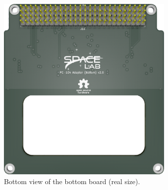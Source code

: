 \begin{figure}[!htb]
    \begin{center}
        \includegraphics[width=8.626cm]{figures/pc104-adapter-bottom-bottom}
        \caption{Bottom view of the bottom board (real size).}
        \label{fig:bottom-board-bottom}
    \end{center}
\end{figure}

